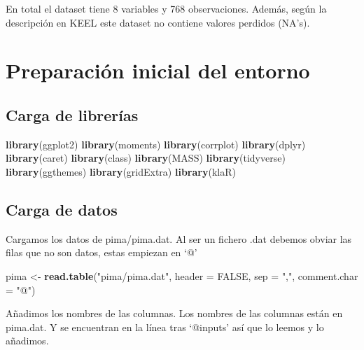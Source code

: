 \documentclass[
]{article}
\newenvironment{Shaded}{\begin{snugshade}}{\end{snugshade}}
\newcommand{\AttributeTok}[1]{\textcolor[rgb]{0.13,0.29,0.53}{#1}}
\newcommand{\ConstantTok}[1]{\textcolor[rgb]{0.56,0.35,0.01}{#1}}
\newcommand{\FunctionTok}[1]{\textcolor[rgb]{0.13,0.29,0.53}{\textbf{#1}}}
\newcommand{\NormalTok}[1]{#1}
\newcommand{\OtherTok}[1]{\textcolor[rgb]{0.56,0.35,0.01}{#1}}
\newcommand{\StringTok}[1]{\textcolor[rgb]{0.31,0.60,0.02}{#1}}
\begin{document}
En total el dataset tiene 8 variables y 768 observaciones. Además, según
la descripción en KEEL este dataset no contiene valores perdidos (NA's).

\hypertarget{preparaciuxf3n-inicial-del-entorno}{%
\section{Preparación inicial del
entorno}\label{preparaciuxf3n-inicial-del-entorno}}

\hypertarget{carga-de-libreruxedas}{%
\subsection{Carga de librerías}\label{carga-de-libreruxedas}}

\begin{Shaded}
\begin{Highlighting}[]
\FunctionTok{library}\NormalTok{(ggplot2)}
\FunctionTok{library}\NormalTok{(moments)}
\FunctionTok{library}\NormalTok{(corrplot)}
\FunctionTok{library}\NormalTok{(dplyr)}
\FunctionTok{library}\NormalTok{(caret)}
\FunctionTok{library}\NormalTok{(class)}
\FunctionTok{library}\NormalTok{(MASS)}
\FunctionTok{library}\NormalTok{(tidyverse)}
\FunctionTok{library}\NormalTok{(ggthemes)}
\FunctionTok{library}\NormalTok{(gridExtra)}
\FunctionTok{library}\NormalTok{(klaR)}
\end{Highlighting}
\end{Shaded}

\hypertarget{carga-de-datos}{%
\subsection{Carga de datos}\label{carga-de-datos}}

Cargamos los datos de pima/pima.dat. Al ser un fichero .dat debemos
obviar las filas que no son datos, estas empiezan en `@'

\begin{Shaded}
\begin{Highlighting}[]
\NormalTok{pima }\OtherTok{\textless{}{-}} \FunctionTok{read.table}\NormalTok{(}\StringTok{"pima/pima.dat"}\NormalTok{, }\AttributeTok{header =} \ConstantTok{FALSE}\NormalTok{,}
                   \AttributeTok{sep =} \StringTok{","}\NormalTok{, }\AttributeTok{comment.char =} \StringTok{"@"}\NormalTok{)}
\end{Highlighting}
\end{Shaded}

Añadimos los nombres de las columnas. Los nombres de las columnas están
en pima.dat. Y se encuentran en la línea tras `@inputs' así que lo
leemos y lo añadimos.
\end{document}

